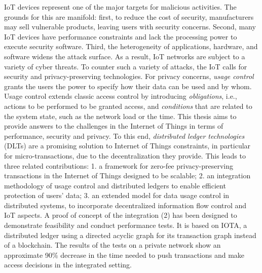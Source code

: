 IoT devices represent one of the major targets for malicious activities. The grounds for this are manifold: first, to reduce the cost of security, manufacturers may sell vulnerable products, leaving users with security concerns. Second, many IoT devices have performance constraints and lack the processing power to execute security software. Third, the heterogeneity of applications, hardware, and software widens the attack surface.
As a result, IoT networks are subject to a variety of cyber threats. To counter such a variety of attacks, the IoT calls for security and privacy-preserving technologies.
 For privacy concerns, \emph{usage control} grants the users the power to specify how their data can be used and by whom. Usage control extends classic access control by introducing \emph{obligations}, i.e., actions to be performed to be granted access, and \emph{conditions} that are related to the system state, such as the network load or the time.
This thesis aims to provide answers to the challenges in the Internet of Things in terms of performance, security and privacy. To this end, \emph{distributed ledger technologies} (DLTs) are a promising solution to Internet of Things constraints, in particular for micro-transactions, due to the decentralization they provide. This leads to three related contributions:
1. a framework for zero-fee privacy-preserving transactions in the Internet of Things designed to be scalable;
2. an integration methodology of usage control and distributed ledgers to enable efficient protection of users' data;
3. an extended model for data usage control in distributed systems, to incorporate decentralized information flow control and IoT aspects.
A proof of concept of the integration (2) has been designed to demonstrate feasibility and conduct performance tests. It is based on IOTA, a distributed ledger using a directed acyclic graph for its transaction graph instead of a blockchain. The results of the tests on a private network
show an approximate 90\% decrease in the time needed to push transactions
and make access decisions in the integrated setting.